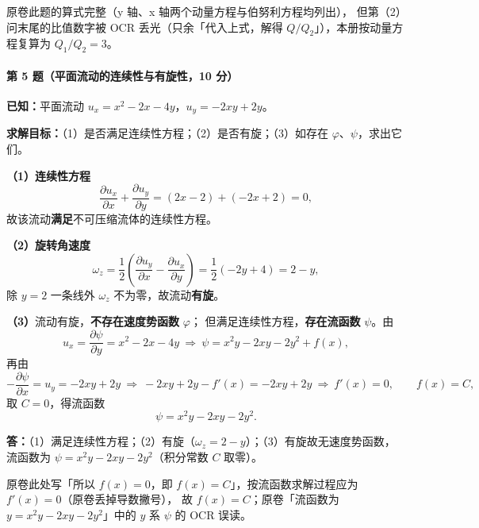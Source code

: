 \begin{tishi}
原卷此题的算式完整（y 轴、x 轴两个动量方程与伯努利方程均列出），
但第（2）问末尾的比值数字被 OCR 丢光（只余「代入上式，解得 $Q/Q_2$」），本册按动量方程复算为 $Q_1/Q_2=3$。
\end{tishi}

\paragraph{第 5 题（平面流动的连续性与有旋性，10 分）}
\begin{jie}
\textbf{已知：}平面流动 $u_x=x^{2}-2x-4y$，$u_y=-2xy+2y$。

\textbf{求解目标：}（1）是否满足连续性方程；（2）是否有旋；（3）如存在 $\varphi$、$\psi$，求出它们。

\textbf{（1）连续性方程}
\[
\frac{\partial u_x}{\partial x}+\frac{\partial u_y}{\partial y}=(2x-2)+(-2x+2)=0,
\]
故该流动\textbf{满足}不可压缩流体的连续性方程。

\textbf{（2）旋转角速度}
\[
\omega_z=\frac12\left(\frac{\partial u_y}{\partial x}-\frac{\partial u_x}{\partial y}\right)
=\frac12\left(-2y+4\right)=2-y,
\]
除 $y=2$ 一条线外 $\omega_z$ 不为零，故流动\textbf{有旋}。

\textbf{（3）}流动有旋，\textbf{不存在速度势函数} $\varphi$；
但满足连续性方程，\textbf{存在流函数} $\psi$。由
\[
u_x=\frac{\partial\psi}{\partial y}=x^{2}-2x-4y
\ \Longrightarrow\
\psi=x^{2}y-2xy-2y^{2}+f(x),
\]
再由
\[
-\frac{\partial\psi}{\partial x}=u_y=-2xy+2y
\ \Longrightarrow\
-2xy+2y-f'(x)=-2xy+2y
\ \Longrightarrow\
f'(x)=0,\qquad f(x)=C ,
\]
取 $C=0$，得流函数
\[
\psi=x^{2}y-2xy-2y^{2}.
\]

\textbf{答：}（1）满足连续性方程；（2）有旋（$\omega_z=2-y$）；（3）有旋故无速度势函数，
流函数为 $\psi=x^{2}y-2xy-2y^{2}$（积分常数 $C$ 取零）。
\end{jie}

\begin{tishi}
原卷此处写「所以 $f(x)=0$，即 $f(x)=C$」，按流函数求解过程应为 $f'(x)=0$（原卷丢掉导数撇号），
故 $f(x)=C$；原卷「流函数为 $y=x^{2}y-2xy-2y^{2}$」中的 $y$ 系 $\psi$ 的 OCR 误读。
\end{tishi}

